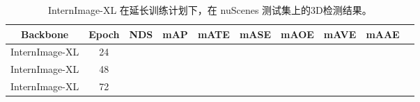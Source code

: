 \setlength{\tabcolsep}{3pt}
\setlength{\doublerulesep}{2\arrayrulewidth}
\renewcommand{\arraystretch}{1.0}
\begin{table}[ht]
    \caption{InternImage-XL 在延长训练计划下，在 nuScenes 测试集上的3D检测结果。}
    \label{table:extend_training}
    \centering

    \begin{tabular}{c|c|cc|cccccc}
        \toprule
        Backbone & Epoch & NDS & mAP & mATE & mASE & mAOE & mAVE & mAAE   \\ 
        \midrule
        InternImage-XL & 24 & & & & & & & \\ 
        InternImage-XL & 48 & & & & & & & \\ 
        InternImage-XL & 72 & & & & & & & \\ 
        \bottomrule
    \end{tabular}
    
\end{table}